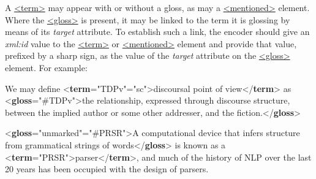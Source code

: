 A \hyperref[TEI.term]{<term>} may appear with or without a gloss, as may a \hyperref[TEI.mentioned]{<mentioned>} element. Where the \hyperref[TEI.gloss]{<gloss>} is present, it may be linked to the term it is glossing by means of its {\itshape target} attribute. To establish such a link, the encoder should give an {\itshape xml:id} value to the \hyperref[TEI.term]{<term>} or \hyperref[TEI.mentioned]{<mentioned>} element and provide that value, prefixed by a sharp sign, as the value of the {\itshape target} attribute on the \hyperref[TEI.gloss]{<gloss>} element. For example: \par\bgroup{}\exampleFont \begin{shaded}\noindent\mbox{}We may define {<\textbf{term}\hspace*{1em}{xml:id}="{TDPv}"\hspace*{1em}{rend}="{sc}">}discoursal point of view{</\textbf{term}>}\mbox{}\newline 
 as \mbox{}\newline 
{<\textbf{gloss}\hspace*{1em}{target}="{\#TDPv}">}the relationship, expressed through discourse\mbox{}\newline 
 structure, between the implied author or some other addresser,\mbox{}\newline 
 and the fiction.{</\textbf{gloss}>}\end{shaded}\egroup\par \noindent  \par\bgroup{}\exampleFont \begin{shaded}\noindent\mbox{}{<\textbf{gloss}\hspace*{1em}{rend}="{unmarked}"\hspace*{1em}{target}="{\#PRSR}">}A computational device that infers\mbox{}\newline 
 structure from grammatical strings of words{</\textbf{gloss}>} is known as a\mbox{}\newline 
{<\textbf{term}\hspace*{1em}{xml:id}="{PRSR}">}parser{</\textbf{term}>}, and much of the history of NLP over the\mbox{}\newline 
 last 20 years has been occupied with the design of parsers.\end{shaded}\egroup\par \par
